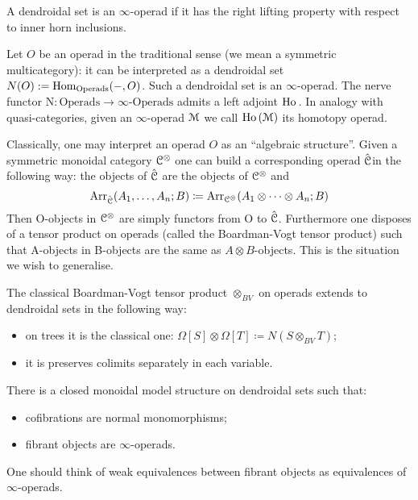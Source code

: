 \begin{refsection}
\begin{definition}
A dendroidal set is an $\infty$-operad if it has the right lifting property with respect to inner horn inclusions.
\end{definition}

\begin{remark}
Let $O$ be an operad in the traditional sense (we mean a symmetric multicategory): it can be interpreted as a dendroidal set $N(O):= \mathrm{Hom}_{\mathrm{Operads}}(-,O)$. Such a dendroidal set is an $\infty$-operad. The nerve functor $\mathrm{N} \colon \mathrm{Operads} \to \infty \textrm{-} \mathrm{Operads}$ admits a left adjoint $\operatorname{\mathrm{Ho} \,}$. In analogy with quasi-categories, given an $\infty$-operad $\mathcal{M}$ we call $\operatorname{\mathrm{Ho} \,}(\mathcal{M})$ its homotopy operad.
\end{remark}

Classically, one may interpret an operad $O$ as an ``algebraic structure''. Given a symmetric monoidal category $\mathcal{C}^{\otimes}$ one can build a corresponding operad $\hat{\mathcal{C}}$in the
following way: the objects of $\hat{\mathcal{C}}$ are the objects of $\mathcal{C}^{\otimes}$ and
\[
\mathrm{Arr}_{\hat{\mathcal{C}}}(A_1,\dots,A_n;B) \coloneqq \mathrm{Arr}_{\mathcal{C}^{\otimes}}(A_1\otimes\dots\otimes A_n;B)
\]
Then O-objects in $\mathcal{C}^{\otimes}$ are simply functors from O to $\hat{\mathcal{C}}$. Furthermore one disposes of a tensor product on operads (called the Boardman-Vogt tensor product)
such that A-objects in B-objects are the same as $A\otimes B$-objects. This is the situation we wish to generalise.

The classical Boardman-Vogt tensor product $\otimes_{BV}$ on operads extends to dendroidal sets in the following way:
\begin{itemize}
\item on trees it is the classical one: $\Omega[S]\otimes\Omega[T] \coloneqq N(S\otimes_{BV}T)$;
\item it is preserves colimits separately in each variable.
\end{itemize}

\begin{proposition}[\cite{Mo-We}]
There is a closed monoidal model structure on dendroidal sets such that:
\begin{itemize}
\item cofibrations are normal monomorphisms;
\item fibrant objects are $\infty$-operads.
\end{itemize}
One should think of weak equivalences between fibrant objects as equivalences of $\infty$-operads.
\end{proposition}


\end{refsection}
